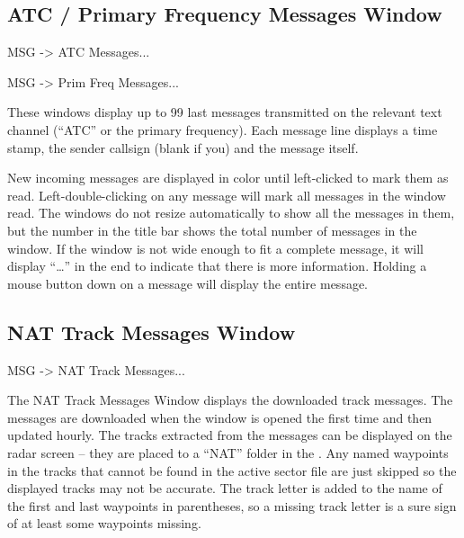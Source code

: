\documentclass[a4paper,oneside,11pt]{memoir}
\begin{document}
\subsection{ATC / Primary Frequency Messages Window}
\label{win:atcmw}
\label{win:pfmw}

 MSG -> ATC Messages...

 MSG -> Prim Freq Messages...

\bigskip


These windows display up to 99 last messages transmitted on the relevant text channel (“ATC” or the primary frequency). Each message line displays a time stamp, the sender callsign (blank if you) and the message itself.

\bigskip

New incoming messages are displayed in  color until left-clicked to mark them as read. Left-double-clicking on any message will mark all messages in the window read. The windows do not resize automatically to show all the messages in them, but the number in the title bar shows the total number of messages in the window. If the window is not wide enough to fit a complete message, it will display “…” in the end to indicate that there is more information. Holding a mouse button down on a message will display the entire message.

\subsection{NAT Track Messages Window}
\label{win:nattmw}

 MSG -> NAT Track Messages...

\bigskip


The NAT Track Messages Window displays the downloaded track messages. The messages are downloaded when the window is opened the first time and then updated hourly. The tracks extracted from the messages can be displayed on the radar screen – they are placed to a “NAT” folder in the . Any named waypoints in the tracks that cannot be found in the active sector file are just skipped so the displayed tracks may not be accurate. The track letter is added to the name of the first and last waypoints in parentheses, so a missing track letter is a sure sign of at least some waypoints missing.
\end{document}
